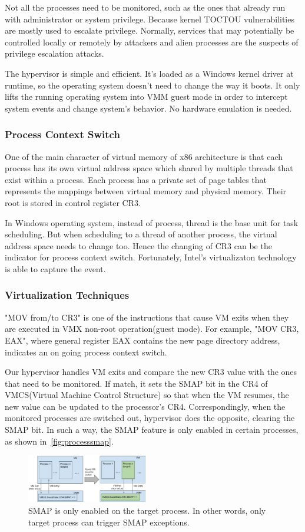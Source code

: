 Not all the processes need to be monitored, such as the ones that already run with administrator or system privilege. Because kernel TOCTOU vulnerabilities are mostly used to escalate privilege. Normally, services that may potentially be controlled locally or remotely by attackers and alien processes are the suspects of privilege escalation attacks.

The hypervisor is simple and efficient. It's loaded as a Windows kernel driver at runtime, so the operating system doesn't need to change the way it boots. It only lifts the running operating system into VMM guest mode in order to intercept system events and change system's behavior. No hardware emulation is needed.  

\subsubsection{Process Context Switch}

One of the main character of virtual memory of x86 architecture is that each process has its own virtual address space which shared by multiple threads that exist within a process. Each process has a private set of page tables that represents the mappings between virtual memory and physical memory. Their root is stored in control register CR3. 

In Windows operating system, instead of process, thread is the base unit for task scheduling. But when scheduling to a thread of another process, the virtual address space needs to change too. Hence the changing of CR3 can be the indicator for process context switch. Fortunately, Intel's virtualizaton technology is able to capture the event.


\subsubsection{Virtualization Techniques}

"MOV from/to CR3" is one of the instructions that cause VM exits when they are executed in VMX non-root operation(guest mode). For example, "MOV CR3, EAX", where general register EAX contains the new page directory address, indicates an on going process context switch.

Our hypervisor handles VM exits and compare the new CR3 value with the ones that need to be monitored. If match, it sets the SMAP bit in the CR4 of VMCS(Virtual Machine Control Structure) so that when the VM resumes, the new value can be updated to the processor's CR4. Correspondingly, when the monitored processes are switched out, hypervisor does the opposite, clearing the SMAP bit. In such a way, the SMAP feature is only enabled in certain processes, as shown in~\autoref{fig:processsmap}.

\begin{figure}[th]
  \includegraphics[width=0.47\textwidth]{figures/processsmap}
  \centering
  \caption{SMAP is only enabled on the target process. In other words, only target process can trigger SMAP exceptions.}
  \label{fig:processsmap}
\end{figure}
